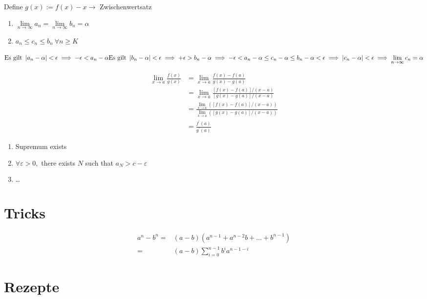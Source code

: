 \Beweis[Fixpunkt 6.4a] Define $g(x):=f(x)-x \rightarrow$ Zwischenwertsatz \\

\Beweis[Sandwich]
\begin{enumerate}
\item $\lim\limits_{n \rightarrow \infty} a_{n} = \lim\limits_{n \rightarrow \infty} b_{n} = \alpha$ 
\item $a_{n} \leq c_{n} \leq b_{n} \ \forall n \geq K$
\end{enumerate}

\(
\text{Es gilt } \left\lvert a_n - \alpha \right\rvert < \epsilon \implies - \epsilon < a_n - \alpha \\
\text{Es gilt } \left\lvert b_n - \alpha \right\rvert < \epsilon \implies + \epsilon > b_n - \alpha \\
\implies - \epsilon < a_n - \alpha \leq c_n - \alpha \leq b_n - \alpha < \epsilon \\
\implies \left\lvert c_n - \alpha \right\rvert < \epsilon \implies \lim\limits_{n \rightarrow \infty} c_{n} = \alpha
\) 

\Beweis[Hôpital]
\begin{align*}
\lim _{x \rightarrow a} \frac{f(x)}{g(x)} &=\lim _{x \rightarrow a} \frac{f(x)-f(a)}{g(x)-g(a)} \\
&=\lim _{x \rightarrow a} \frac{[f(x)-f(a)] /(x-a)}{[g(x)-g(a)] /(x-a)} \\
&=\frac{\lim _{x \rightarrow a}([f(x)-f(a)] /(x-a))}{\lim _{x \rightarrow a}([g(x)-g(a)] /(x-a))} \\
&=\frac{f^{\prime}(a)}{g^{\prime}(a)}
\end{align*}

\begin{enumerate}
\item Supremum exists
\item $\forall \varepsilon>0,$ there exists $N$ such that $a_{N}>c-\varepsilon$
\item \dots
\end{enumerate}

\section{Tricks}
\Trick
\begin{align*}
a^n-b^n =& (a-b)(a^{n-1} + a^{n-2} b +\dots+b^{n-1}) \\
		=& (a-b)\sum_{i=0}^{n-1} b^{i}a^{n-1-i} 
\end{align*}

\section{Rezepte}

